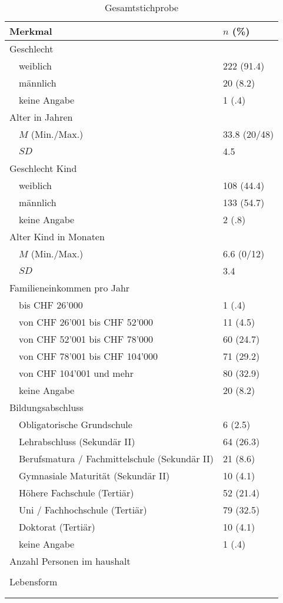 \begin{table}[htbp]

\begin{tabular}{m{0.5em}  m{20em}  m{5em}} 
  \hline
  \multicolumn{2}{l}{\textbf{Merkmal}} & \textbf{$n$ (\%)} \\
  \hline
  \multicolumn{2}{l}{Geschlecht} \\ 
   & weiblich & 222 (91.4)\\ 
   & männlich & 20 (8.2)\\ 
   & keine Angabe & 1 (.4)\\ 
   
  \multicolumn{2}{l}{Alter in Jahren} \\
  & $M$ (Min./Max.) & 33.8 (20/48) \\
  & $SD$ & 4.5 \\
  
  \multicolumn{2}{l}{Geschlecht Kind} \\
   & weiblich & 108 (44.4)\\ 
   & männlich & 133 (54.7)\\ 
   & keine Angabe & 2 (.8)\\
  
  \multicolumn{2}{l}{Alter Kind in Monaten} \\
  &  $M$ (Min./Max.) & 6.6 (0/12)\\
  & $SD$ & 3.4\\
  
  \multicolumn{2}{l}{Familieneinkommen pro Jahr} \\
  & bis CHF 26'000 & 1 (.4)\\
  & von CHF 26'001 bis CHF 52'000 & 11 (4.5)\\
  & von CHF 52'001 bis CHF 78'000 & 60 (24.7)\\
  & von CHF 78'001 bis CHF 104'000 & 71 (29.2)\\
  & von CHF 104'001 und mehr & 80 (32.9)\\
  & keine Angabe & 20 (8.2)\\
  
  \multicolumn{2}{l}{Bildungsabschluss} \\
  & Obligatorische Grundschule & 6 (2.5)\\
  & Lehrabschluss (Sekundär II)& 64 (26.3)\\
  & Berufsmatura / Fachmittelschule (Sekundär II) & 21 (8.6)\\
  & Gymnasiale Maturität (Sekundär II) & 10 (4.1)\\
  & Höhere Fachschule (Tertiär) & 52 (21.4)\\
  & Uni / Fachhochschule (Tertiär) & 79 (32.5)\\
  & Doktorat (Tertiär) & 10 (4.1)\\
  & keine Angabe & 1 (.4)\\
  
  \multicolumn{2}{l}{Anzahl Personen im haushalt} \\
  & & \\
  
  \multicolumn{2}{l}{Lebensform} \\
  & & \\
  \hline
  &&\\
\end{tabular}
\caption{Gesamtstichprobe}
\label{table:Gesamtstichprobe}
\end{table}
